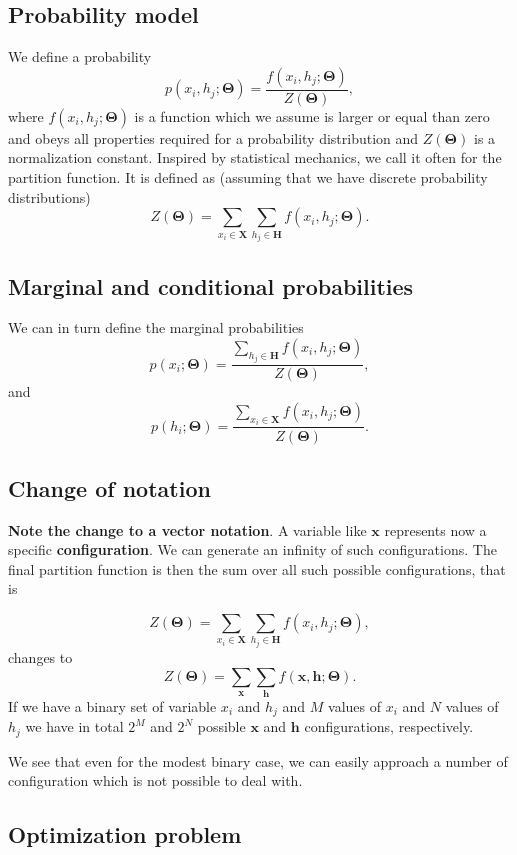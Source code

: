 \documentclass[%
oneside,                 %
final,                   %
10pt]{article}
\begin{document}
\subsection{Probability model}

We define a probability
\[
p(x_i,h_j;\bm{\Theta}) = \frac{f(x_i,h_j;\bm{\Theta})}{Z(\bm{\Theta})},
\]
where $f(x_i,h_j;\bm{\Theta})$ is a function which we assume is larger or
equal than zero and obeys all properties required for a probability
distribution and $Z(\bm{\Theta})$ is a normalization constant. Inspired by
statistical mechanics, we call it often for the partition function.
It is defined as (assuming that we have discrete probability distributions)
\[
Z(\bm{\Theta})=\sum_{x_i\in \bm{X}}\sum_{h_j\in \bm{H}} f(x_i,h_j;\bm{\Theta}).
\]

\subsection{Marginal and conditional probabilities}

We can in turn define the marginal probabilities
\[
p(x_i;\bm{\Theta}) = \frac{\sum_{h_j\in \bm{H}}f(x_i,h_j;\bm{\Theta})}{Z(\bm{\Theta})},
\]
and 
\[
p(h_i;\bm{\Theta}) = \frac{\sum_{x_i\in \bm{X}}f(x_i,h_j;\bm{\Theta})}{Z(\bm{\Theta})}.
\]

\subsection{Change of notation}

\textbf{Note the change to a vector notation}. A variable like $\bm{x}$
represents now a specific \textbf{configuration}. We can generate an infinity
of such configurations. The final partition function is then the sum
over all such possible configurations, that is

\[
Z(\bm{\Theta})=\sum_{x_i\in \bm{X}}\sum_{h_j\in \bm{H}} f(x_i,h_j;\bm{\Theta}),
\]
changes to
\[
Z(\bm{\Theta})=\sum_{\bm{x}}\sum_{\bm{h}} f(\bm{x},\bm{h};\bm{\Theta}).
\]
If we have a binary set of variable $x_i$ and $h_j$ and $M$ values of $x_i$ and $N$ values of $h_j$ we have in total $2^M$ and $2^N$ possible $\bm{x}$ and $\bm{h}$ configurations, respectively.

We see that even for the modest binary case, we can easily approach a
number of configuration which is not possible to deal with.

\subsection{Optimization problem}
\end{document}
